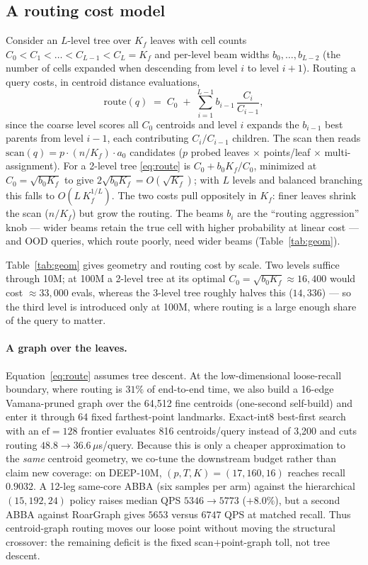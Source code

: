 \documentclass{article}
\begin{document}
\subsection{A routing cost model}
\label{sec:routecost}
Consider an $L$-level tree over $K_f$ leaves with cell counts
$C_0 < C_1 < \dots < C_{L-1} < C_L = K_f$ and per-level beam widths
$b_0,\dots,b_{L-2}$ (the number of cells expanded when descending from level $i$ to
level $i{+}1$). Routing a query costs, in centroid distance evaluations,
\begin{equation}
\label{eq:route}
\mathrm{route}(q) \;=\; C_0 \;+\; \sum_{i=1}^{L-1} b_{i-1}\,\frac{C_i}{C_{i-1}},
\end{equation}
since the coarse level scores all $C_0$ centroids and level $i$ expands the $b_{i-1}$
best parents from level $i{-}1$, each contributing $C_i/C_{i-1}$ children. The scan
then reads $\mathrm{scan}(q)=p\cdot(n/K_f)\cdot a_0$ candidates ($p$ probed leaves
$\times$ points/leaf $\times$ multi-assignment). For a 2-level tree \eqref{eq:route}
is $C_0 + b_0 K_f/C_0$, minimized at $C_0=\sqrt{b_0 K_f}$ to give
$2\sqrt{b_0 K_f}=O(\sqrt{K_f})$; with $L$ levels and balanced branching this falls to
$O(L\,K_f^{1/L})$. The two costs pull oppositely in $K_f$: finer leaves shrink the scan
($n/K_f$) but grow the routing. The beams $b_i$ are the ``routing aggression'' knob ---
wider beams retain the true cell with higher probability at linear cost --- and OOD
queries, which route poorly, need wider beams (Table~\ref{tab:geom}).

Table~\ref{tab:geom} gives geometry and routing cost by scale. Two levels suffice
through 10M; at 100M a 2-level tree at its optimal $C_0=\sqrt{b_0 K_f}\approx16{,}400$
would cost $\approx\!33{,}000$ evals, whereas the 3-level tree roughly halves this
($14{,}336$) --- so the third level is introduced only at 100M, where routing is a
large enough share of the query to matter.

\paragraph{A graph over the leaves.} Equation~\eqref{eq:route} assumes tree
descent. At the low-dimensional loose-recall boundary, where routing is $31\%$ of
end-to-end time, we also build a 16-edge Vamana-pruned graph over the 64,512 fine
centroids (one-second self-build) and enter it through 64 fixed farthest-point
landmarks. Exact-int8 best-first search with an $\mathrm{ef}=128$ frontier evaluates
816 centroids/query instead of 3,200 and cuts routing $48.8\to36.6\,\mu$s/query.
Because this is only a cheaper approximation to the \emph{same} centroid geometry,
we co-tune the downstream budget rather than claim new coverage: on DEEP-10M,
$(p,T,K)=(17,160,16)$ reaches recall $0.9032$. A 12-leg same-core ABBA (six
samples per arm) against the
hierarchical $(15,192,24)$ policy raises median QPS $5346\to5773$ ($+8.0\%$), but a
second ABBA against RoarGraph gives $5653$ versus $6747$ QPS at matched recall.
Thus centroid-graph routing moves our loose point without moving the structural
crossover: the remaining deficit is the fixed scan$+$point-graph toll, not tree
descent.
\end{document}
